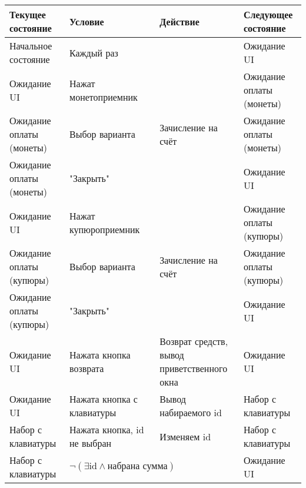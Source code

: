 \documentclass[10pt]{article}
\begin{document}
\begin{tabularx}{\textwidth}{X|X|X|X}
Текущее состояние           &Условие                                                     &Действие                                            &Следующее состояние     \\
    \hline
Начальное состояние         &Каждый раз                                                  &                                                    &Ожидание UI             \\
Ожидание UI                 &Нажат монетоприемник                                        &                                                    &Ожидание оплаты (монеты)\\
Ожидание оплаты (монеты)    &Выбор варианта                                              &Зачисление на счёт                                  &Ожидание оплаты (монеты)\\
Ожидание оплаты (монеты)    &"Закрыть"                                                   &                                                    &Ожидание UI             \\
Ожидание UI                 &Нажат купюроприемник                                        &                                                    &Ожидание оплаты (купюры)\\
Ожидание оплаты (купюры)    &Выбор варианта                                              &Зачисление на счёт                                  &Ожидание оплаты (купюры)\\
Ожидание оплаты (купюры)    &"Закрыть"                                                   &                                                    &Ожидание UI             \\
Ожидание UI                 &Нажата кнопка возврата                                      &Возврат средств, вывод приветственного окна         &Ожидание UI             \\
Ожидание UI                 &Нажата кнопка с клавиатуры                                  &Вывод набираемого id                                &Набор с клавиатуры      \\
Набор с клавиатуры          &Нажата кнопка, id не выбран                                 &Изменяем id                                         &Набор с клавиатуры      \\
Набор с клавиатуры          & \( \lnot (\exists \text{id} \land \text{набрана сумма}) \) &                                                    &Ожидание UI             \\

\end{tabularx}
\end{document}
